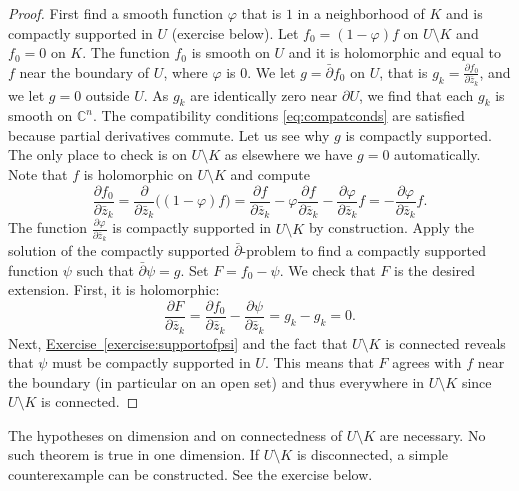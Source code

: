 \documentclass[12pt,openany]{book}
\newcommand{\C}{{\mathbb{C}}}
\theoremstyle{plain}
\theoremstyle{remark}
\theoremstyle{definition}
\theoremstyle{exercise}
\theoremstyle{example}
\newcommand{\exerciseref}[1]{\hyperref[#1]{Exercise~\ref*{#1}}}
\begin{document}
\begin{proof}
First find a smooth function $\varphi$ that is $1$ in a neighborhood of
$K$ and is compactly supported in $U$ (exercise below).  Let
$f_0 = (1-\varphi)f$ on $U \setminus K$ and $f_0 = 0$ on $K$.  The function $f_0$
is smooth on $U$ and it is holomorphic
and equal to $f$ near the boundary of $U$, where $\varphi$ is $0$.
We let $g = \bar{\partial} f_0$ on $U$, that is $g_k = \frac{\partial
f_0}{\partial \bar{z}_k}$,
and we let $g=0$ outside $U$.
As $g_k$ are identically zero near $\partial U$, we find that each
$g_k$ is smooth on $\C^n$.
The compatibility conditions
\eqref{eq:compatconds} are satisfied
because partial derivatives commute.
Let us see why $g$ is compactly supported.  The
only place to check is on $U \setminus K$ as elsewhere we have $g = 0$
automatically.  Note that $f$ is holomorphic on $U \setminus K$ and compute
\begin{equation*}
\frac{\partial f_0}{\partial \bar{z}_k}
=
\frac{\partial }{\partial \bar{z}_k}
\bigl((1-\varphi)f\bigr)
=
\frac{\partial f}{\partial \bar{z}_k}
- \varphi \frac{\partial f}{\partial \bar{z}_k}
- \frac{\partial \varphi}{\partial \bar{z}_k} f
=
- \frac{\partial \varphi}{\partial \bar{z}_k} f .
\end{equation*}
The function $\frac{\partial \varphi}{\partial \bar{z}_k}$ is compactly supported in
$U \setminus K$ by construction.
Apply the solution of the compactly supported $\bar{\partial}$-problem
to find a
compactly supported function $\psi$ such that $\bar{\partial}\psi = g$.
Set $F = f_0 - \psi$.  We check that $F$ is the desired
extension.  First, it is holomorphic:
\begin{equation*}
\frac{\partial F}{\partial \bar{z}_k}
=
\frac{\partial f_0}{\partial \bar{z}_k}
-
\frac{\partial \psi}{\partial \bar{z}_k}
=
g_k
-
g_k
= 0 .
\end{equation*}
Next, \exerciseref{exercise:supportofpsi} and the fact that $U \setminus
K$ is connected reveals that $\psi$ must be compactly supported in $U$.
This means that $F$ agrees with $f$ near the boundary (in particular
on an open set) and thus everywhere in $U \setminus K$ since $U \setminus K$
is connected.
\end{proof}

The hypotheses on dimension and on connectedness of $U \setminus K$
are necessary.
No such theorem is true in one dimension.
If $U \setminus K$ is disconnected, a simple
counterexample can be constructed.
See the exercise below.
\end{document}
